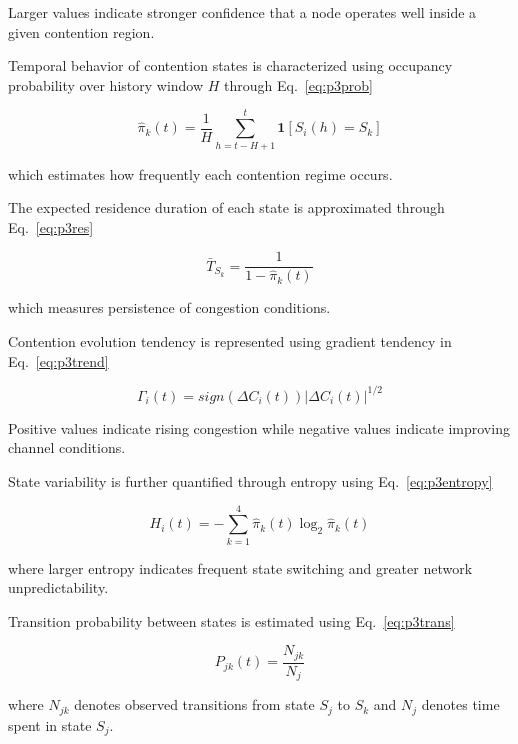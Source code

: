 \documentclass[a4paper,fleqn,final,1p]{cas-dc}
\numberwithin{equation}{section}
\begin{document}
Larger values indicate stronger confidence that a node operates well inside a given contention region.

Temporal behavior of contention states is characterized using occupancy probability over history window $H$ through Eq.~\ref{eq:p3prob}

\begin{equation}
\hat \pi_k(t)=
\frac1H
\sum_{h=t-H+1}^{t}
\mathbf1
\left[
S_i(h)=S_k
\right]
\label{eq:p3prob}
\end{equation}

which estimates how frequently each contention regime occurs.

The expected residence duration of each state is approximated through Eq.~\ref{eq:p3res}

\begin{equation}
\bar T_{S_k}
=
\frac1
{1-\hat\pi_k(t)}
\label{eq:p3res}
\end{equation}

which measures persistence of congestion conditions.

Contention evolution tendency is represented using gradient tendency in Eq.~\ref{eq:p3trend}

\begin{equation}
\Gamma_i(t)=
sign
\left(
\Delta C_i(t)
\right)
|\Delta C_i(t)|^{1/2}
\label{eq:p3trend}
\end{equation}

Positive values indicate rising congestion while negative values indicate improving channel conditions.

State variability is further quantified through entropy using Eq.~\ref{eq:p3entropy}

\begin{equation}
H_i(t)=
-\sum_{k=1}^{4}
\hat \pi_k(t)
\log_2
\hat \pi_k(t)
\label{eq:p3entropy}
\end{equation}

where larger entropy indicates frequent state switching and greater network unpredictability.

Transition probability between states is estimated using Eq.~\ref{eq:p3trans}

\begin{equation}
P_{jk}(t)=
\frac{
N_{jk}
}{
N_j
}
\label{eq:p3trans}
\end{equation}

where $N_{jk}$ denotes observed transitions from state $S_j$ to $S_k$ and $N_j$ denotes time spent in state $S_j$.
\end{document}
